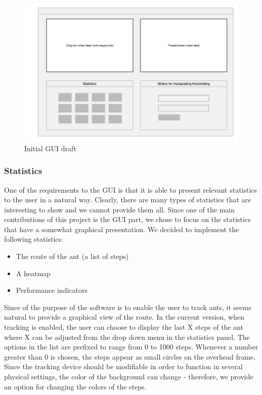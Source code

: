 \begin{figure}[!ht]
    \centering
    \includegraphics[scale = 0.3]{img/termes_gui.png}
    \caption{Initial GUI draft}
    \label{fig:gui}
\end{figure}

\subsubsection{Statistics} \mbox{}\par
One of the requirements to the GUI is that it is able to present relevant statistics to the user in a natural way. Clearly, there are many types of statistics that are interesting to show and we cannot provide them all. Since one of the main contributions of this project is the GUI part, we chose to focus on the statistics that have a somewhat graphical presentation. We decided to implement the following statistics:

\begin{itemize}
  \item{The route of the ant (a list of steps)}
  \item{A heatmap}
  \item{Performance indicators}
\end{itemize}

Since of the purpose of the software is to enable the user to track ants, it seems natural to provide a graphical view of the route. In the current version, when tracking is enabled, the user can choose to display the last X steps of the ant where X can be adjusted from the drop down menu in the statistics panel. The options in the list are prefixed to range from 0 to 1000 steps. Whenever a number greater than 0 is chosen, the steps appear as small circles on the overhead frame. Since the tracking device should be modifiable in order to function in several physical settings, the color of the background can change - therefore, we provide an option for changing the colors of the steps. \\	

